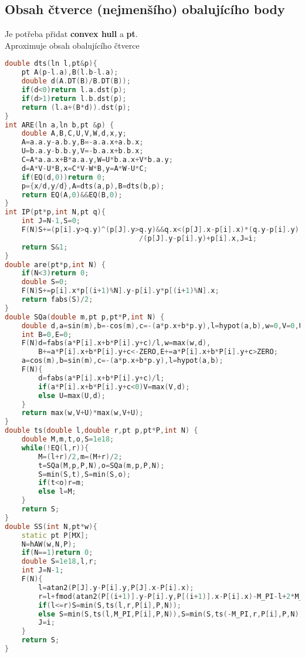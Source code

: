 \documentclass[11pt]{article}
\begin{document}
\subsection{Obsah čtverce (nejmenšího) obalujícího body}
Je potřeba přidat \textbf{convex hull} a \textbf{pt}.
\\Aproximuje obsah obalujícího čtverce
\begin{lstlisting}[language=C++]
double dts(ln l,pt&p){
    pt A(p-l.a),B(l.b-l.a);
    double d(A.DT(B)/B.DT(B));
    if(d<0)return l.a.dst(p);
    if(d>1)return l.b.dst(p);
    return (l.a+(B*d)).dst(p);
}
int ARE(ln a,ln b,pt &p) {
    double A,B,C,U,V,W,d,x,y;
    A=a.a.y-a.b.y,B=-a.a.x+a.b.x;
    U=b.a.y-b.b.y,V=-b.a.x+b.b.x;
    C=A*a.a.x+B*a.a.y,W=U*b.a.x+V*b.a.y;
    d=A*V-U*B,x=C*V-W*B,y=A*W-U*C;
    if(EQ(d,0))return 0;
    p={x/d,y/d},A=dts(a,p),B=dts(b,p);
    return EQ(A,0)&&EQ(B,0);
}
int IP(pt*p,int N,pt q){
    int J=N-1,S=0;
    F(N)S+=(p[i].y>q.y)^(p[J].y>q.y)&&q.x<(p[J].x-p[i].x)*(q.y-p[i].y)
                                /(p[J].y-p[i].y)+p[i].x,J=i;
    return S&1;
}
double are(pt*p,int N) {
    if(N<3)return 0;
    double S=0;
    F(N)S+=p[i].x*p[(i+1)%N].y-p[i].y*p[(i+1)%N].x;
    return fabs(S)/2;
}
double SQa(double m,pt p,pt*P,int N) {
    double d,a=sin(m),b=-cos(m),c=-(a*p.x+b*p.y),l=hypot(a,b),w=0,V=0,U=0;
    int B=0,E=0;
    F(N)d=fabs(a*P[i].x+b*P[i].y+c)/l,w=max(w,d),
        B+=a*P[i].x+b*P[i].y+c<-ZERO,E+=a*P[i].x+b*P[i].y+c>ZERO;
    a=cos(m),b=sin(m),c=-(a*p.x+b*p.y),l=hypot(a,b);
    F(N){
        d=fabs(a*P[i].x+b*P[i].y+c)/l;
        if(a*P[i].x+b*P[i].y+c<0)V=max(V,d);
        else U=max(U,d);
    }
    return max(w,V+U)*max(w,V+U);
}
double ts(double l,double r,pt p,pt*P,int N) {
    double M,m,t,o,S=1e18;
    while(!EQ(l,r)){
        M=(l+r)/2,m=(M+r)/2;
        t=SQa(M,p,P,N),o=SQa(m,p,P,N);
        S=min(S,t),S=min(S,o);
        if(t<o)r=m;
        else l=M;
    }
    return S;
}
double SS(int N,pt*w){
    static pt P[MX];
    N=hAW(w,N,P);
    if(N==1)return 0;
    double S=1e18,l,r;
    int J=N-1;
    F(N){
        l=atan2(P[J].y-P[i].y,P[J].x-P[i].x);
        r=l+fmod(atan2(P[(i+1)].y-P[i].y,P[(i+1)].x-P[i].x)-M_PI-l+2*M_PI,2*M_PI);
        if(l<=r)S=min(S,ts(l,r,P[i],P,N));
        else S=min(S,ts(l,M_PI,P[i],P,N)),S=min(S,ts(-M_PI,r,P[i],P,N));
        J=i;
    }
    return S;
}
\end{lstlisting}
\end{document}
